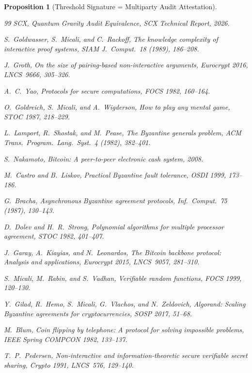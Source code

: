 \documentclass[12pt,a4paper]{article}
\newtheorem{proposition}[theorem]{Proposition}
\theoremstyle{remark}
\begin{document}
\begin{proposition}[Threshold Signature = Multiparty Audit Attestation]
\begin{thebibliography}{99}
SCX,
\emph{Quantum Gravity Audit Equivalence},
SCX Technical Report, 2026.

S.~Goldwasser, S.~Micali, and C.~Rackoff,
\emph{The knowledge complexity of interactive proof systems},
SIAM J.~Comput.~18 (1989), 186--208.

J.~Groth,
\emph{On the size of pairing-based non-interactive arguments},
Eurocrypt 2016, LNCS~9666, 305--326.

A.~C.~Yao,
\emph{Protocols for secure computations},
FOCS 1982, 160--164.

O.~Goldreich, S.~Micali, and A.~Wigderson,
\emph{How to play any mental game},
STOC 1987, 218--229.

L.~Lamport, R.~Shostak, and M.~Pease,
\emph{The Byzantine generals problem},
ACM Trans.~Program.~Lang.~Syst.~4 (1982), 382--401.

S.~Nakamoto,
\emph{Bitcoin: A peer-to-peer electronic cash system},
2008.

M.~Castro and B.~Liskov,
\emph{Practical Byzantine fault tolerance},
OSDI 1999, 173--186.

G.~Bracha,
\emph{Asynchronous Byzantine agreement protocols},
Inf.~Comput.~75 (1987), 130--143.

D.~Dolev and H.~R.~Strong,
\emph{Polynomial algorithms for multiple processor agreement},
STOC 1982, 401--407.

J.~Garay, A.~Kiayias, and N.~Leonardos,
\emph{The Bitcoin backbone protocol: Analysis and applications},
Eurocrypt 2015, LNCS~9057, 281--310.

S.~Micali, M.~Rabin, and S.~Vadhan,
\emph{Verifiable random functions},
FOCS 1999, 120--130.

Y.~Gilad, R.~Hemo, S.~Micali, G.~Vlachos, and N.~Zeldovich,
\emph{Algorand: Scaling Byzantine agreements for cryptocurrencies},
SOSP 2017, 51--68.

M.~Blum,
\emph{Coin flipping by telephone: A protocol for solving impossible problems},
IEEE Spring COMPCON 1982, 133--137.

T.~P.~Pedersen,
\emph{Non-interactive and information-theoretic secure verifiable secret sharing},
Crypto 1991, LNCS~576, 129--140.


\end{thebibliography}
\end{proposition}
\end{document}
